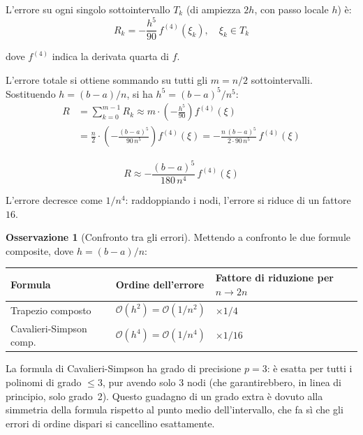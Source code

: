 \documentclass[a4paper,12pt]{article}
\theoremstyle{definition}
\newtheorem{osservazione}{Osservazione}[section]
\theoremstyle{remark}
\begin{document}
L'errore su ogni singolo sottointervallo $T_k$ (di ampiezza $2h$, con
passo locale $h$) è:
\[
  R_k = -\frac{h^5}{90}\,f^{(4)}(\xi_k), \quad \xi_k \in T_k
\]

\noindent dove $f^{(4)}$ indica la derivata quarta di $f$.

L'errore totale si ottiene sommando su tutti gli $m = n/2$
sottointervalli. Sostituendo $h = (b-a)/n$, si ha $h^5 = (b-a)^5/n^5$:
\begin{align*}
  R &= \sum_{k=0}^{m-1} R_k
     \approx m \cdot \left(-\frac{h^5}{90}\right) f^{(4)}(\xi) \\
  &= \frac{n}{2} \cdot \left(-\frac{(b-a)^5}{90\,n^5}\right) f^{(4)}(\xi)
   = -\frac{n\,(b-a)^5}{2 \cdot 90\,n^5}\,f^{(4)}(\xi)
\end{align*}

\begin{equation}
  \boxed{R \approx -\frac{(b-a)^5}{180\,n^4}\,f^{(4)}(\xi)}
  \label{eq:errore-simpson-comp}
\end{equation}

\noindent L'errore decresce come $1/n^4$: raddoppiando i nodi, l'errore
si riduce di un fattore $16$.

\begin{osservazione}[Confronto tra gli errori]
Mettendo a confronto le due formule composite, dove $h = (b-a)/n$:
\begin{center}
\begin{tabular}{lll}
\toprule
Formula & Ordine dell'errore & Fattore di riduzione per $n \to 2n$ \\
\midrule
Trapezio composto       & $\mathcal{O}(h^2) = \mathcal{O}(1/n^2)$ & $\times 1/4$ \\
Cavalieri-Simpson comp. & $\mathcal{O}(h^4) = \mathcal{O}(1/n^4)$ & $\times 1/16$ \\
\bottomrule
\end{tabular}
\end{center}

\noindent La formula di Cavalieri-Simpson ha grado di precisione $p = 3$:
è esatta per tutti i polinomi di grado $\le 3$, pur avendo solo 3 nodi
(che garantirebbero, in linea di principio, solo grado~2). Questo guadagno
di un grado extra è dovuto alla simmetria della formula rispetto al punto
medio dell'intervallo, che fa sì che gli errori di ordine dispari si
cancellino esattamente.
\end{osservazione}

\end{document}
